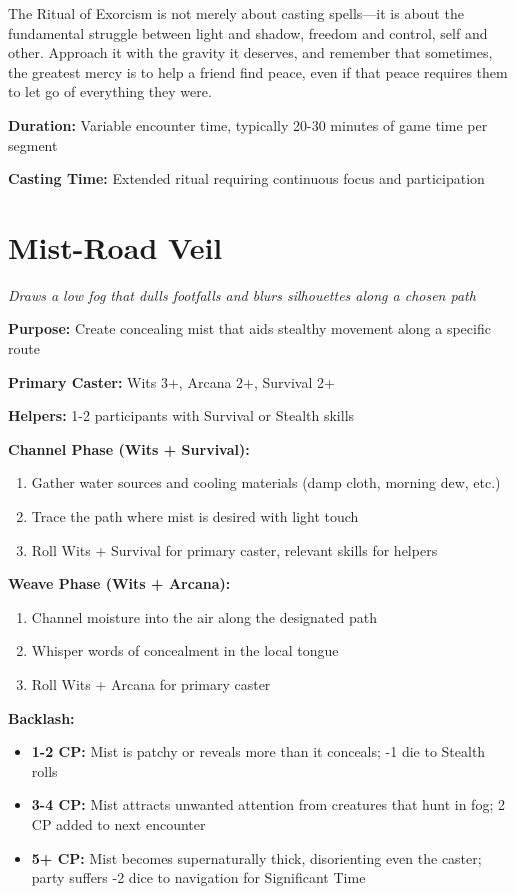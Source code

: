 \documentclass[12pt,twoside]{book}
\begin{document}
The Ritual of Exorcism is not merely about casting spells—it is about the fundamental struggle between light and shadow, freedom and control, self and other. Approach it with the gravity it deserves, and remember that sometimes, the greatest mercy is to help a friend find peace, even if that peace requires them to let go of everything they were.

\textbf{Duration:} Variable encounter time, typically 20-30 minutes of game time per segment

\textbf{Casting Time:} Extended ritual requiring continuous focus and participation

\section*{Mist-Road Veil}
\textit{Draws a low fog that dulls footfalls and blurs silhouettes along a chosen path}

\textbf{Purpose:} Create concealing mist that aids stealthy movement along a specific route

\textbf{Primary Caster:} Wits 3+, Arcana 2+, Survival 2+

\textbf{Helpers:} 1-2 participants with Survival or Stealth skills

\textbf{Channel Phase (Wits + Survival):}
\begin{enumerate}
\item Gather water sources and cooling materials (damp cloth, morning dew, etc.)
\item Trace the path where mist is desired with light touch
\item Roll Wits + Survival for primary caster, relevant skills for helpers
\end{enumerate}

\textbf{Weave Phase (Wits + Arcana):}
\begin{enumerate}
\item Channel moisture into the air along the designated path
\item Whisper words of concealment in the local tongue
\item Roll Wits + Arcana for primary caster
\end{enumerate}

\textbf{Backlash:}
\begin{itemize}
\item \textbf{1-2 CP:} Mist is patchy or reveals more than it conceals; -1 die to Stealth rolls
\item \textbf{3-4 CP:} Mist attracts unwanted attention from creatures that hunt in fog; 2 CP added to next encounter
\item \textbf{5+ CP:} Mist becomes supernaturally thick, disorienting even the caster; party suffers -2 dice to navigation for Significant Time
\end{itemize}
\end{document}
